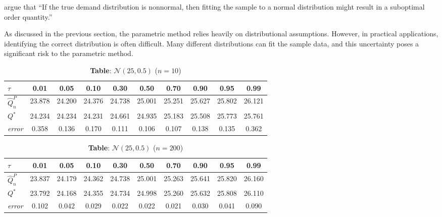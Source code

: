 \cite{levi2015} argue that ``If the true demand distribution is nonnormal, then fitting the sample to a normal distribution might result in a suboptimal order quantity.''

As discussed in the previous section, the parametric method relies heavily on distributional assumptions. However, in practical applications, identifying the correct distribution is often difficult. Many different distributions can fit the sample data, and this uncertainty poses a significant risk to the parametric method.

\begin{table}[H]
\centering
\caption{\textbf{Table}: $\mathcal{N}(25,0.5)$ ($n=10$)}
\label{tab:normal_n10}
\renewcommand{\arraystretch}{1.15}
\begin{tabular}{lccccccccc}
\toprule
$\tau$          & 0.01   & 0.05   & 0.10   & 0.30   & 0.50   & 0.70   & 0.90   & 0.95   & 0.99   \\ \midrule
$\hat{Q}_n^P$   & 23.878 & 24.200 & 24.376 & 24.738 & 25.001 & 25.251 & 25.627 & 25.802 & 26.121 \\
$Q^*$           & 24.234 & 24.234 & 24.231 & 24.661 & 24.935 & 25.183 & 25.508 & 25.773 & 25.761 \\
\textit{error}  & 0.358  & 0.136  & 0.170  & 0.111  & 0.106  & 0.107  & 0.138  & 0.135  & 0.362  \\ \bottomrule
\end{tabular}
\end{table}

\begin{table}[H]
\centering
\caption{\textbf{Table}: $\mathcal{N}(25,0.5)$ ($n=200$)}
\label{tab:normal_n200}
\renewcommand{\arraystretch}{1.15}
\begin{tabular}{lccccccccc}
\toprule
$\tau$         & 0.01 & 0.05 & 0.10 & 0.30 & 0.50 & 0.70 & 0.90 & 0.95 & 0.99 \\ \midrule
$\hat{Q}_n^P$  & 23.837 & 24.179 & 24.362 & 24.738 & 25.001 & 25.263 & 25.641 & 25.820 & 26.160 \\
$Q^*$          & 23.792 & 24.168 & 24.355 & 24.734 & 24.998 & 25.260 & 25.632 & 25.808 & 26.110 \\
\textit{error} &  0.102 &  0.042 &  0.029 &  0.022 &  0.022 &  0.021 &  0.030 &  0.041 &  0.090 \\ \bottomrule
\end{tabular}
\end{table}

